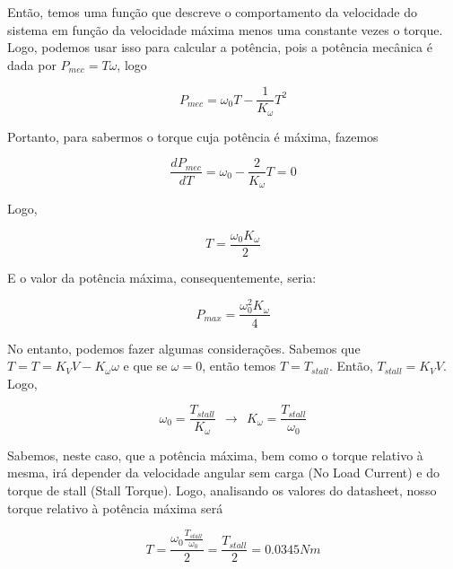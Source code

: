 \documentclass[a4paper, 12pt]{article}
\begin{document}
Então, temos uma função que descreve o comportamento da velocidade do sistema em função da velocidade máxima menos uma constante vezes o torque. Logo, podemos usar isso para calcular a potência, pois a potência mecânica é dada por $P_{mec} = T\omega$, logo

\begin{equation}
    P_{mec} = \omega_0T - \frac{1}{K_\omega}T^2
\end{equation}


Portanto, para sabermos o torque cuja potência é máxima, fazemos

\begin{equation}
    \frac{dP_{mec}}{dT} = \omega_0 - \frac{2}{K_\omega}T = 0
\end{equation}

Logo, 

\begin{equation}
      T = \frac{\omega_0 K_\omega}{2}
\end{equation}

E o valor da potência máxima, consequentemente, seria:

\begin{equation}\label{pmax}
      P_{max} = \frac{\omega_0^2 K_\omega}{4}
\end{equation}

No entanto, podemos fazer algumas considerações. Sabemos que $T = T = K_VV - K_\omega \omega$ e que se $\omega =0$, então temos $T = T_{stall}$. Então, $T_{stall} = K_VV$. Logo, 

\begin{equation}
    \omega_0 = \frac{T_{stall}}{K_\omega} \>\ \longrightarrow \>\ K_\omega = \frac{T_{stall}}{\omega_0}
\end{equation}



Sabemos, neste caso, que a potência máxima, bem como o torque relativo à mesma, irá depender da velocidade angular sem carga  (No Load Current) e do torque de stall (Stall Torque). Logo, analisando os valores do datasheet, nosso torque relativo à potência máxima será

\begin{equation}
      T = \frac{\omega_0 \frac{T_{stall}}{\omega_0} }{2} = \frac{T_{stall}}{2} = 0.0345Nm
\end{equation}\\ \\
\end{document}
